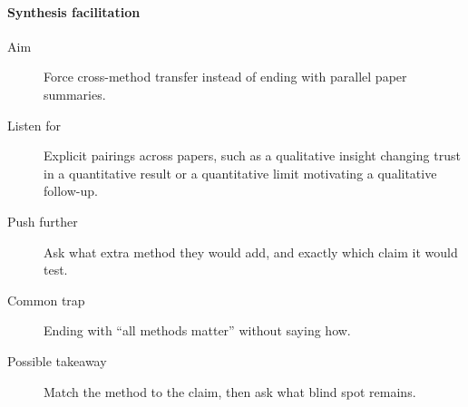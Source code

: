 \paragraph{Synthesis facilitation}
\begin{description}
  \item[Aim] Force cross-method transfer instead of ending with parallel paper
    summaries.
  \item[Listen for] Explicit pairings across papers, such as a qualitative
    insight changing trust in a quantitative result or a quantitative limit
    motivating a qualitative follow-up.
  \item[Push further] Ask what extra method they would add, and exactly which
    claim it would test.
  \item[Common trap] Ending with \enquote{all methods matter} without saying
    how.
  \item[Possible takeaway] Match the method to the claim, then ask what blind
    spot remains.
\end{description}
